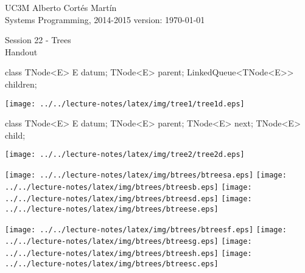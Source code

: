 \documentclass[a4paper, 10pt]{article}
\newcommand{\realtitle}{Session 22 - Trees}
\begin{document}
\footnotesize{
\makebox[\linewidth]{\rule{\textwidth}{0.4pt}}
UC3M \hfill Alberto Cortés Martín\\
Systems Programming, 2014-2015 \hfill version: \today\\
\makebox[\linewidth]{\rule{\textwidth}{0.4pt}}
\begin{center}
  \small{\realtitle}\\Handout
\end{center}
\makebox[\linewidth]{\rule{\textwidth}{0.4pt}}
}
\vspace{0.2cm}

\begin{multicols}{2}
\begin{blackboard}
class TNode<E> {
    E datum;
    TNode<E> parent;
    LinkedQueue<TNode<E>> children;
}
\end{blackboard}
\texttt{[image: ../../lecture-notes/latex/img/tree1/tree1d.eps]}
\columnbreak
\begin{blackboard}
class TNode<E> {
    E datum;
    TNode<E> parent;
    TNode<E> next;
    TNode<E> child;
}
\end{blackboard}
\texttt{[image: ../../lecture-notes/latex/img/tree2/tree2d.eps]}
\end{multicols}




\texttt{[image: ../../lecture-notes/latex/img/btrees/btreesa.eps]}
\texttt{[image: ../../lecture-notes/latex/img/btrees/btreesb.eps]}
\texttt{[image: ../../lecture-notes/latex/img/btrees/btreesd.eps]}
\texttt{[image: ../../lecture-notes/latex/img/btrees/btreese.eps]}

\texttt{[image: ../../lecture-notes/latex/img/btrees/btreesf.eps]}
\texttt{[image: ../../lecture-notes/latex/img/btrees/btreesg.eps]}
\texttt{[image: ../../lecture-notes/latex/img/btrees/btreesh.eps]}
\texttt{[image: ../../lecture-notes/latex/img/btrees/btreesc.eps]}

\newpage
\end{document}

